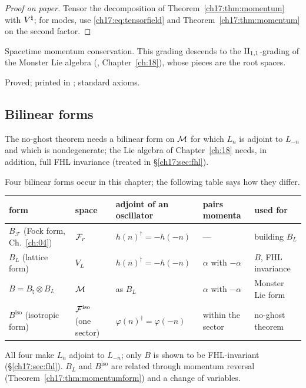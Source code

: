 \begin{proof}[Proof on paper]
Tensor the decomposition of Theorem~\ref{ch17:thm:momentum} with ${V^{\natural}}$; for modes, use
\eqref{ch17:eq:tensorfield} and Theorem~\ref{ch17:thm:momentum} on the second factor.
\end{proof}

\begin{physics}
Spacetime momentum conservation.  This grading descends to the ${\mathrm{II}_{1,1}}$-grading of the Monster Lie algebra
(, Chapter~\ref{ch:18}), whose pieces are the root spaces.
\end{physics}

\begin{status}
Proved; printed in ; standard axioms.
\end{status}

\subsection{Bilinear forms}

The no-ghost theorem needs a bilinear form on $\mathcal{M}$ for which $L_n$ is adjoint to $L_{-n}$ and which is
nondegenerate; the Lie algebra of Chapter~\ref{ch:18} needs, in addition, full FHL invariance (treated in
\S\ref{ch17:sec:fhl}).

Four bilinear forms occur in this chapter; the following table says how they differ.
\begin{center}
\small
\begin{tabular}{p{}p{}p{}p{}p{}}
\toprule
form & space & adjoint of an oscillator & pairs momenta & used for \\ \midrule
$B_{\mathcal F}$ (Fock form, Ch.~\ref{ch:04}) & $\mathcal{F}_r$ & $h(n)^\dagger=-h(-n)$ & --- & building $B_L$ \\
$B_L$ (lattice form) & $V_L$ & $h(n)^\dagger=-h(-n)$ & $\alpha$ with $-\alpha$ & $B$, FHL invariance \\
$B=B_\natural\otimes B_L$ & $\mathcal{M}$ & as $B_L$ & $\alpha$ with $-\alpha$ & Monster Lie form \\
$B^{\mathrm{iso}}$ (isotropic form) & $\mathcal{F}^{\mathrm{iso}}$ (one sector) & $\varphi(n)^\dagger=\varphi(-n)$ & within the sector & no-ghost theorem \\
\bottomrule
\end{tabular}
\end{center}
All four make $L_n$ adjoint to $L_{-n}$; only $B$ is shown to be FHL-invariant (\S\ref{ch17:sec:fhl}).  $B_L$ and
$B^{\mathrm{iso}}$ are related through momentum reversal (Theorem~\ref{ch17:thm:momentumform}) and a change of variables.


